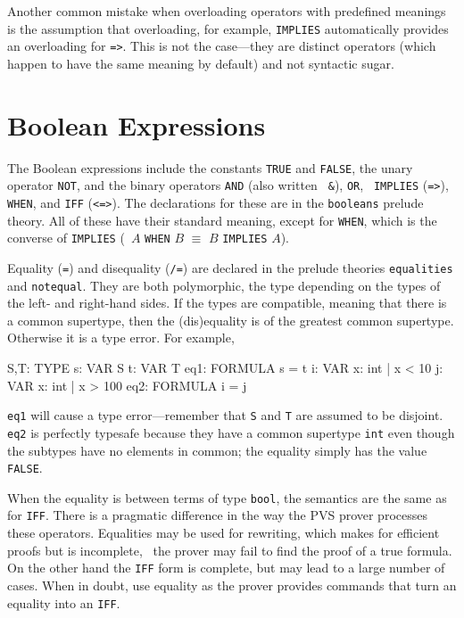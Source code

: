 Another common mistake when overloading operators with predefined meanings
is the assumption that overloading, for example, {\tt IMPLIES} automatically
provides an overloading for {\tt =>}.  This is not the case---they are distinct
operators (which happen to have the same meaning by default) and not syntactic
sugar.


\section{Boolean Expressions}\label{bool-exprs}

The Boolean expressions include the constants \texttt{TRUE} and
\texttt{FALSE},
the unary operator \texttt{NOT}, and
the binary operators \texttt{AND} (also written
\texttt{ \&}\index{\&}), \texttt{OR}, \texttt{
IMPLIES}
(\texttt{=>}),
\texttt{WHEN}, and
\texttt{IFF}
(\texttt{<=>}).  The declarations for these are in
the \texttt{booleans} prelude theory.  All of these have their standard
meaning, except for \texttt{WHEN}, which is the converse of
\texttt{IMPLIES} (\ie\ $A$ \texttt{WHEN} $B$ $\equiv$ $B$ \texttt{IMPLIES}
$A$).

Equality (\texttt{=}\index{=}) and
disequality (\texttt{/=}\index{/=}) are declared in the
prelude theories \texttt{equalities} and \texttt{notequal}.  They are both
polymorphic, the type depending on the types of the left- and right-hand
sides.  If the types are compatible, meaning that there is a common
supertype, then the (dis)equality is of the greatest common supertype.  Otherwise it is a type
error.  For example,
\begin{pvsex}
  S,T: TYPE
  s: VAR S
  t: VAR T
  eq1: FORMULA s = t
  i: VAR \setb{}x: int | x < 10\sete
  j: VAR \setb{}x: int | x > 100\sete
  eq2: FORMULA i = j
\end{pvsex}
%
\texttt{eq1} will cause a type error---remember that \texttt{S} and \texttt{T}
are assumed to be disjoint.  \texttt{eq2} is perfectly typesafe because
they have a common supertype \texttt{int} even though the subtypes have no
elements in common; the equality simply has the value \texttt{FALSE}.

When the equality is between terms of type \texttt{bool}, the semantics
are the same as for \texttt{IFF}.  There is a pragmatic difference in the
way the PVS prover processes these operators.  Equalities may be
used for rewriting, which makes for efficient proofs but is incomplete,
\ie\ the prover may fail to find the proof of a true formula.  On the other
hand the \texttt{IFF} form is complete, but may lead to a large number of
cases.  When in doubt, use equality as the prover provides commands
that turn an equality into an \texttt{IFF}.

